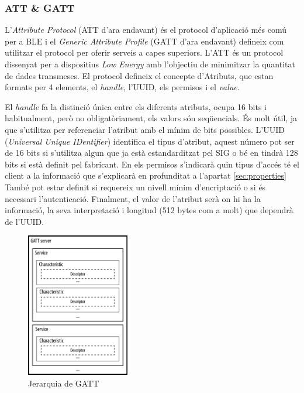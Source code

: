 \subsubsection{ATT \& GATT}
L'\textit{Attribute Protocol} (ATT d'ara endavant) és el protocol d'aplicació més comú per a BLE i el \textit{Generic Attribute Profile} (GATT d'ara endavant) defineix com utilitzar el protocol per oferir serveis a capes superiors.
L'ATT és un protocol dissenyat per a dispositius \textit{Low Energy} amb l'objectiu de minimitzar la quantitat de dades transmeses.
El protocol defineix el concepte d'Atributs, que estan formats per 4 elements, el \textit{handle}, l'UUID, els permisos  i el \textit{value}.

El \textit{handle} fa la distinció única entre els diferents atributs, ocupa 16 bits i habitualment, però no obligatòriament, els valors són seqüencials. És molt útil, ja que s'utilitza per referenciar l'atribut amb el mínim de bits possibles.
L'UUID (\textit{Universal Unique IDentifier}) identifica el tipus d'atribut, aquest número pot ser de 16 bits si s'utilitza algun que ja està estandarditzat pel SIG o bé en tindrà 128 bits si està definit pel fabricant.
En els permisos s'indicarà quin tipus d'accés té el client a la informació que s'explicarà en profunditat a l'apartat \ref{sec:properties}
També pot estar definit si requereix un nivell mínim d'encriptació o si és necessari l'autenticació.
Finalment, el valor de l'atribut serà on hi ha la informació, la seva interpretació i longitud (512 bytes com a molt) que dependrà de l'UUID.

\begin{figure}[h!]
	\begin{center}
		\includegraphics[width=0.4\textwidth]{./images/GATT_Hierarchy.png}
		\caption{Jerarquia de GATT \cite{GATT_Hierarchy}}
		\label{fig:Gatt_Hierarchy}
	\end{center}
\end{figure}

